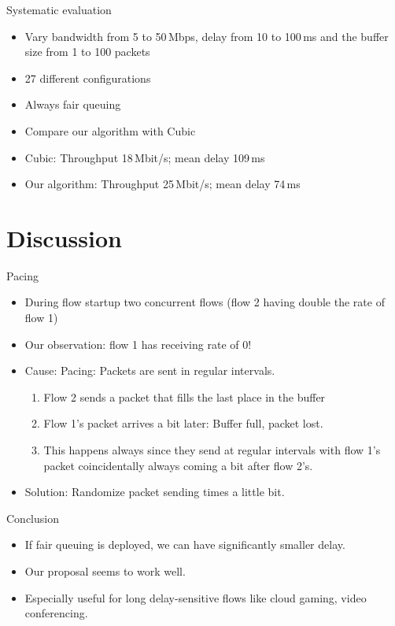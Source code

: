 \documentclass[xcolor={dvipsnames}]{beamer}
\begin{document}
\begin{frame}{Systematic evaluation}
\begin{itemize}
\item Vary bandwidth from 5 to 50\,Mbps, delay from 10 to 100\,ms and the buffer size from 1 to 100 packets
\item 27 different configurations
\item Always fair queuing
\item Compare our algorithm with Cubic
\item Cubic: Throughput 18\,Mbit/s; mean delay 109\,ms
\item Our algorithm: Throughput 25\,Mbit/s; mean delay 74\,ms
\end{itemize}
\end{frame}

\section{Discussion}
\begin{frame}{Pacing}
\begin{itemize}
\item During flow startup two concurrent flows (flow 2 having double the rate of flow 1)
\item Our observation: flow 1 has receiving rate of 0!
\item Cause: Pacing: Packets are sent in regular intervals. 
\begin{enumerate}
\item Flow 2 sends a packet that fills the last place in the buffer
\item Flow 1's packet arrives a bit later: Buffer full, packet lost.
\item This happens always since they send at regular intervals with flow 1's packet coincidentally always coming a bit after flow 2's. 
\end{enumerate}
\item Solution: Randomize packet sending times a little bit. 
\end{itemize}
\end{frame}

\begin{frame}{Conclusion}
\begin{itemize}
\item If fair queuing is deployed, we can have significantly smaller delay. 
\item Our proposal seems to work well.
\item Especially useful for long delay-sensitive flows like cloud gaming, video conferencing. 
\end{itemize}
\end{frame}

\makelastslide
\end{document}
